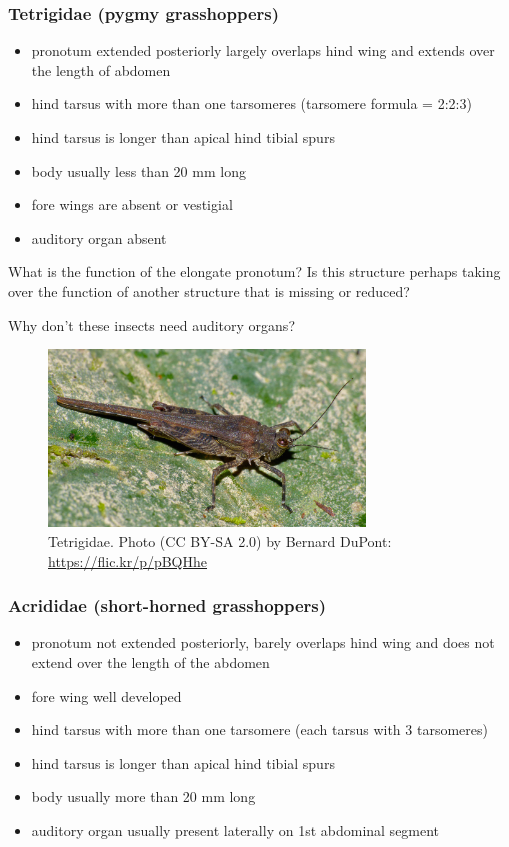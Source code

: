 \documentclass[letterpaper, 11pt]{article}
\begin{document}
\subsubsection*{Tetrigidae (pygmy grasshoppers)}
\begin{itemize}
\item pronotum extended posteriorly largely overlaps hind wing and extends over the length of abdomen
\item hind tarsus with more than one tarsomeres (tarsomere formula = 2:2:3)
\item hind tarsus is longer than apical hind tibial spurs
\item body usually less than 20 mm long
\item fore wings are absent or vestigial
\item auditory organ absent
\end{itemize}

\noindent{}What is the function of the elongate pronotum? Is this structure perhaps taking over the function of another structure that is missing or reduced?\vspace{3cm}

\noindent{}Why don't these insects need auditory organs?\vspace{3cm}

\begin{figure}[ht!]
  \centering
    \includegraphics[width=0.75\textwidth]{tetrig1}
  \caption{Tetrigidae. Photo (CC BY-SA 2.0) by Bernard DuPont: \url{https://flic.kr/p/pBQHhe}}
  \label{fig:tetrig}
\end{figure}

\subsubsection*{Acrididae (short-horned grasshoppers)}
\begin{itemize}
\item pronotum not extended posteriorly, barely overlaps hind wing and does not extend over the length of the abdomen
\item fore wing well developed
\item hind tarsus with more than one tarsomere (each tarsus with 3 tarsomeres)
\item hind tarsus is longer than apical hind tibial spurs
\item body usually more than 20 mm long
\item auditory organ usually present laterally on 1st abdominal segment
\end{itemize}
\end{document}
